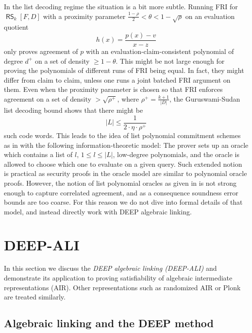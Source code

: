 \documentclass[11pt,article,oneside]{memoir}
\theoremstyle{definition}
\theoremstyle{remark}
\DeclareMathOperator{\RS}{\mathsf{RS}}
\begin{document}
In the list decoding regime the situation is a bit more subtle. 
Running FRI for $\RS_k[F,D]$ with a proximity parameter $\frac{1-\rho}{2}<\theta<1-\sqrt\rho$  on an evaluation quotient
\[
h(x)=\frac{p(x)-v}{x-z}
\]
only proves agreement of $p$ with an evaluation-claim-consistent polynomial of degree $d^+$ on a set of density $\geq1-\theta$. 
This might be not large enough for proving the polynomials of different runs of FRI being equal. 
In fact, they might differ from claim to claim, unless one runs a joint batched FRI argument on them. 
Even when the proximity parameter is chosen so that FRI enforces agreement on a set of density $>\sqrt{\rho^+}$, where $\rho^+ = \frac{k+1}{|D|}$, the Guruswami-Sudan list decoding bound shows that there might be 
\[
|L|\leq \frac{1}{2\cdot \eta\cdot \rho^+}
\]
such code words. 
This leads to the idea of list polynomial commitment schemes as in \cite{Redshift} with the following information-theoretic model: 
The prover sets up an oracle which contains a list of $l$, $1\leq l\leq |L|$, low-degree polynomials, and the oracle is allowed to choose which one to evaluate on a given query. 
Such extended notion is practical as security proofs in the oracle model are similar to polynomial oracle proofs.  
However, the notion of list polynomial oracles as given in \cite{Redshift} is not strong enough to capture correlated agreement, and as a consequence soundness error bounds are too coarse. 
For this reason we do not dive into formal details of that model, and instead directly work with DEEP algebraic linking.


\chapter{DEEP-ALI}

In this section we discuss the \textit{DEEP algebraic linking (DEEP-ALI)} \cite{DEEPFRI} and demonstrate its application to proving satisfiability of algebraic intermediate representations (AIR). 
Other representations such as randomized AIR or Plonk are treated similarly. 

\section{Algebraic linking and the DEEP method}
 
\end{document}
